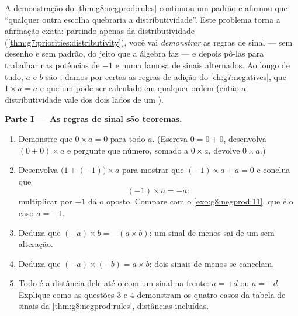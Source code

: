 \begin{problem}
\label{pb:g8:negprod:1}
A demonstração do \cref{thm:g8:negprod:rules} continuou um padrão e
afirmou que ``qualquer outra escolha quebraria a distributividade''.
Este problema torna a afirmação exata: partindo apenas da
distributividade (\cref{thm:g7:priorities:distributivity}), você vai
\emph{demonstrar} as regras de sinal --- sem desenho e sem padrão, do
jeito que a álgebra faz --- e depois pô-las para trabalhar nas
potências de $-1$ e numa  famosa de sinais alternados. Ao longo de
tudo, $a$ e $b$ são ; damos por certas as regras de
adição do \cref{ch:g7:negatives}, que $1 \times a = a$ e que um 
pode ser calculado em qualquer ordem (então a distributividade vale dos
dois lados de um ).

\medskip
\noindent\textbf{Parte I --- As regras de sinal são teoremas.}
\begin{enumerate}
  \item Demonstre que $0 \times a = 0$ para todo  $a$.
        (Escreva $0 = 0 + 0$, desenvolva $(0 + 0) \times a$ e pergunte
        que número, somado a $0 \times a$, devolve $0 \times a$.)
  \item Desenvolva $\bigl(1 + (-1)\bigr) \times a$ para mostrar que
        $(-1) \times a + a = 0$ e conclua que
        \[
        (-1) \times a = -a :
        \]
        multiplicar por $-1$ dá o oposto. Compare com o
        \cref{exo:g8:negprod:11}, que é o caso $a = -1$.
  \item Deduza que $(-a) \times b = -(a \times b)$: um sinal de menos
        sai de um  sem alteração.
  \item Deduza que $(-a) \times (-b) = a \times b$: dois sinais de
        menos se cancelam.
  \item Todo  é a distância dele até o  com um sinal
        na frente: $a = +d$ ou $a = -d$. Explique como as questões 3 e
        4 demonstram os quatro casos da tabela de sinais da
        \cref{thm:g8:negprod:rules}, distâncias incluídas.
\end{enumerate}


\end{problem}
